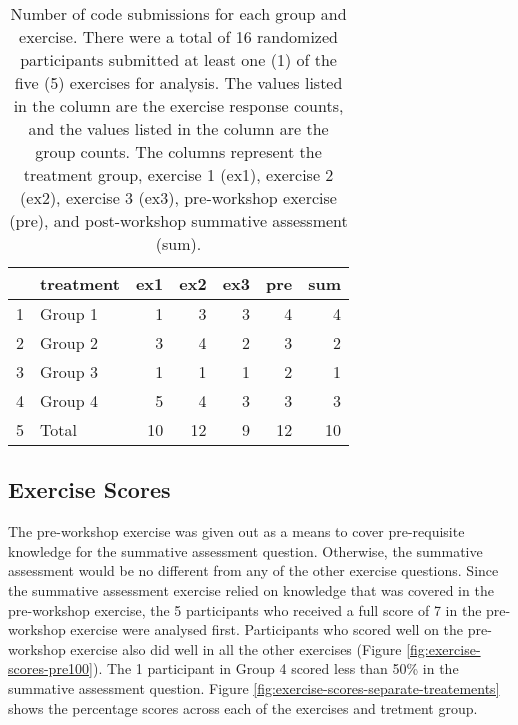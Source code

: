 \documentclass[040-assessment.tex]{subfiles}
\begin{document}
    \begin{table}[ht]
        \centering
        \caption[Number of responses by group and exercise]
        {Number of code submissions for each group and exercise.
         There were a total of 16 randomized participants submitted at least one (1) of the five (5) exercises for analysis.
         The values listed in the  column are the exercise response counts,
         and the values listed in the  column are the group counts.
         The columns represent the
         treatment group,
         exercise 1 (ex1), exercise 2 (ex2), exercise 3 (ex3),
         pre-workshop exercise (pre), and
         post-workshop summative assessment (sum).
        }
        \begin{tabular}{rlrrrrr}
            \hline
           & treatment & ex1 & ex2 & ex3 & pre & sum \\
            \hline
            1 & Group 1 &   1 &   3 &   3 &   4 &   4 \\
            2 & Group 2 &   3 &   4 &   2 &   3 &   2 \\
            3 & Group 3 &   1 &   1 &   1 &   2 &   1 \\
            4 & Group 4 &   5 &   4 &   3 &   3 &   3 \\
            5 & Total &  10 &  12 &   9 &  12 &  10 \\
             \hline
          \end{tabular}
          \label{tab:exercise-treatment-response-counts}
    \end{table}

\subsection{Exercise Scores}

    The pre-workshop exercise was given out as a means to cover pre-requisite knowledge for the
    summative assessment question.
    Otherwise, the summative assessment would be no different from any of the other exercise
    questions.
    Since the summative assessment exercise relied on knowledge that was covered in the
    pre-workshop exercise,
    the 5 participants who received a full score of 7 in the pre-workshop exercise were analysed first.
    Participants who scored well on the pre-workshop exercise also did well in all the other exercises
    (Figure \ref{fig:exercise-scores-pre100}).
    The 1 participant in Group 4 scored less than 50\% in the summative assessment question.
    Figure \ref{fig:exercise-scores-separate-treatements} shows the percentage scores across each
    of the exercises and tretment group.
\end{document}
